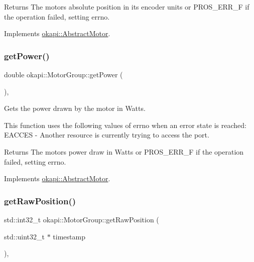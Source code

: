\begin{DoxyReturn}{Returns}
The motor\textquotesingle{}s absolute position in its encoder units or P\+R\+O\+S\+\_\+\+E\+R\+R\+\_\+F if the operation failed, setting errno. 
\end{DoxyReturn}


Implements \mbox{\hyperlink{classokapi_1_1AbstractMotor_a4f9d74e054600c5ddb49ebb8164004d3}{okapi\+::\+Abstract\+Motor}}.

\mbox{\label{classokapi_1_1MotorGroup_a67bdc04d59ba8293ccd58d26b849c9f0}} 
\subsubsection{\texorpdfstring{getPower()}{getPower()}}
{\footnotesize\ttfamily double okapi\+::\+Motor\+Group\+::get\+Power (\begin{DoxyParamCaption}{ }\end{DoxyParamCaption})\hspace{0.3cm}{\ttfamily [override]}, {\ttfamily [virtual]}}

Gets the power drawn by the motor in Watts.

This function uses the following values of errno when an error state is reached\+: E\+A\+C\+C\+ES -\/ Another resource is currently trying to access the port.

\begin{DoxyReturn}{Returns}
The motor\textquotesingle{}s power draw in Watts or P\+R\+O\+S\+\_\+\+E\+R\+R\+\_\+F if the operation failed, setting errno. 
\end{DoxyReturn}


Implements \mbox{\hyperlink{classokapi_1_1AbstractMotor_aed423ac40cec85c5880f7954b6d810fe}{okapi\+::\+Abstract\+Motor}}.

\mbox{\label{classokapi_1_1MotorGroup_ac7d9b049f24ddc141b2b63f7e3e4d3ba}} 
\subsubsection{\texorpdfstring{getRawPosition()}{getRawPosition()}}
{\footnotesize\ttfamily std\+::int32\+\_\+t okapi\+::\+Motor\+Group\+::get\+Raw\+Position (\begin{DoxyParamCaption}\item[{std\+::uint32\+\_\+t $\ast$}]{timestamp }\end{DoxyParamCaption})\hspace{0.3cm}{\ttfamily [override]}, {\ttfamily [virtual]}}

